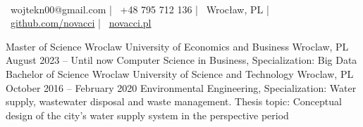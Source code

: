 \documentclass[]{awesome-cv}
\begin{document}
\begin{center}
	  \\
	\vspace{2mm}
	{\faEnvelope\ wojtekn00@gmail.com} | {\faMobile\ +48 795 712 136} | {\faMapMarker\ Wrocław, PL} | {\faLink\ \href{https://github.com/Novacci}{github.com/novacci}} | {\faGlobe\ \href{https://novacci.pl/}{novacci.pl}}
\end{center}
\begin{cventries}
	\cventry
	{Master of Science}
	{Wroclaw University of Economics and Business}
	{Wroclaw, PL}
	{August 2023 – Until now}
	{Computer Science in Business, Specialization: Big Data}
	\cventry
	{Bachelor of Science}
	{Wroclaw University of Science and Technology}
	{Wroclaw, PL}
	{October 2016 – February 2020}
	{Environmental Engineering, Specialization: Water supply, wastewater disposal and waste management. Thesis topic: Conceptual design of the city's water supply system in the perspective period}
\end{cventries}
\end{document}
